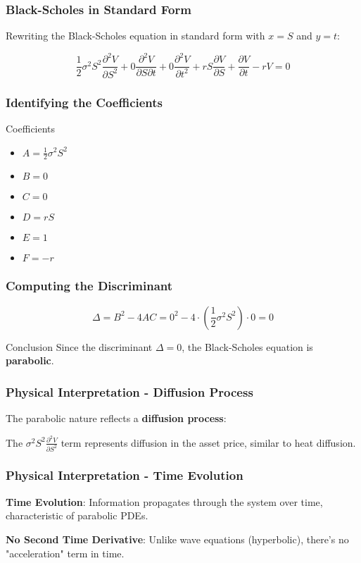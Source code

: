 \documentclass[aspectratio=169]{beamer}
\begin{document}
\begin{frame}
\frametitle{Black-Scholes in Standard Form}
Rewriting the Black-Scholes equation in standard form with \(x = S\) and \(y = t\):

\[\frac{1}{2}\sigma^2 S^2 \frac{\partial^2 V}{\partial S^2} + 0 \frac{\partial^2 V}{\partial S \partial t} + 0 \frac{\partial^2 V}{\partial t^2} + rS \frac{\partial V}{\partial S} + \frac{\partial V}{\partial t} - rV = 0\]
\end{frame}

\begin{frame}
\frametitle{Identifying the Coefficients}
\begin{block}{Coefficients}
\begin{itemize}
\item \(A = \frac{1}{2}\sigma^2 S^2\)
\item \(B = 0\)
\item \(C = 0\)
\item \(D = rS\)
\item \(E = 1\)
\item \(F = -r\)
\end{itemize}
\end{block}
\end{frame}

\begin{frame}
\frametitle{Computing the Discriminant}
\[\Delta = B^2 - 4AC = 0^2 - 4 \cdot \left(\frac{1}{2}\sigma^2 S^2\right) \cdot 0 = 0\]

\begin{block}{Conclusion}
Since the discriminant \(\Delta = 0\), the Black-Scholes equation is \textbf{parabolic}.
\end{block}
\end{frame}

\begin{frame}
\frametitle{Physical Interpretation - Diffusion Process}
The parabolic nature reflects a \textbf{diffusion process}:

The \(\sigma^2 S^2 \frac{\partial^2 V}{\partial S^2}\) term represents diffusion in the asset price, similar to heat diffusion.
\end{frame}

\begin{frame}
\frametitle{Physical Interpretation - Time Evolution}
\textbf{Time Evolution}: Information propagates through the system over time, characteristic of parabolic PDEs.

\textbf{No Second Time Derivative}: Unlike wave equations (hyperbolic), there's no "acceleration" term in time.
\end{frame}
\end{document}

